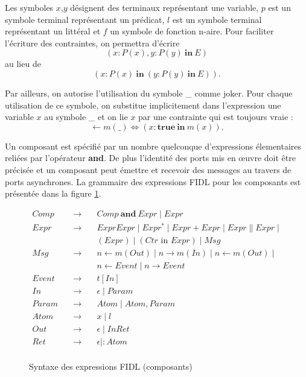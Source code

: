 Les symboles $x$,$y$ d\'esignent des terminaux repr\'esentant une
variable, $p$ est un symbole terminal repr\'esentant un pr\'edicat,
$l$ est un symbole terminal repr\'esentant un litt\'eral et  $f$ un symbole
de fonction n-aire. Pour faciliter l'\'ecriture des contraintes, on
permettra d'\'ecrire 
$$
(x:P(x),y:P(y)\ \mathbf{in}\ E)
$$
au lieu  de
$$
(x:P(x)\ \mathbf{in}\ (y:P(y)\ \mathbf{in}\ E)).
$$

Par ailleurs, on autorise l'utilisation du symbole \_ comme \og
joker\fg. Pour chaque utilisation de ce symbole, on substitue
implicitement dans l'expression une variable $x$ au symbole \_ et on
lie $x$ par une contrainte qui est toujours vraie : 
$$
\leftarrow m(\_) \Leftrightarrow (x:\mathbf{true}\ \mathbf{in}\ m(x)).
$$

Un composant est sp\'ecifi\'e par un
nombre quelconque d'expressions \'elementaires reli\'ees par
l'op\'erateur \textbf{and}. De plus l'identit\'e des ports mis en
\oe uvre doit \^etre pr\'ecis\'ee et un composant peut \'emettre
et recevoir des messages au travers de ports asynchrones. La grammaire
des expressions \textsf{FIDL} pour les composants est pr\'esent\'ee dans la
figure \ref{fig-syn-fidl-comp}.

\begin{figure}
    \begin{equation}
        \label{eq:syn-fidl-comp}\begin{array}{ccl}
            Comp &\quad\rightarrow\quad& Comp \mathbf{~and~} Expr \mid Expr \\
            Expr &\quad\rightarrow\quad& Expr Expr \mid Expr^* \mid Expr + Expr \mid Expr \parallel Expr \mid \\
            && (Expr) \mid (Ctr\mbox{~in~} Expr) \mid Msg\\
            Msg &\quad\rightarrow\quad& n \leftarrow m(Out) \mid n
            \rightarrow m(In) \mid n \leftarrow m(Out) \mid \\ 
            &&n \leftarrow Event \mid n \rightarrow Event \\
            Event &\quad\rightarrow\quad& t [ In ] \\
            In &\quad\rightarrow\quad& \epsilon \mid Param \\
            Param &\quad\rightarrow\quad& Atom \mid Atom,Param \\
            Atom &\quad\rightarrow\quad& x \mid l  \\
            Out &\quad\rightarrow\quad& \epsilon \mid In Ret \\
            Ret &\quad\rightarrow\quad& \epsilon \mid : Atom \\
        \end{array}
    \end{equation}
    \caption{Syntaxe des expressions \textsf{FIDL} (composants)}
    \label{fig-syn-fidl-comp}
\end{figure}

